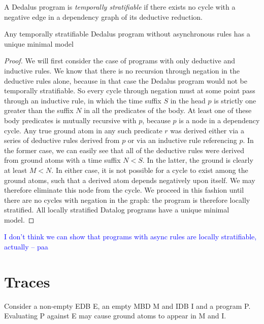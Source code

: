\documentclass{acm_proc_article-sp-sigmod09}
\newcommand{\paa}[1]{{\textcolor{blue}{#1 -- paa}}}
\begin{document}
\begin{definition}
A Dedalus program is \emph{temporally stratifiable} if there exists no cycle with a negative edge in a dependency graph of
its deductive reduction.
\end{definition}

\begin{lemma}
Any temporally stratifiable Dedalus program without asynchronous rules has a unique minimal model
\end{lemma}
\begin{proof}
We will first consider the case of programs with only deductive and inductive rules.  We know that there is no recursion
through negation in the deductive rules alone, because in that case the Dedalus program would not be temporally 
stratifiable.  So every cycle through negation must at some point pass through an inductive rule, in which the time suffix $S$ in
the head $p$ is strictly one greater than the suffix $N$ in all the predicates of the body.  At least one of these body predicates is mutually recursive
with $p$, because $p$ is a node in a dependency cycle.  Any true ground atom in any such predicate $r$
was derived either via a series of deductive rules derived from $p$ or via an inductive rule referencing $p$.  In the former case, we can
easily see that all of the deductive rules were derived from ground atoms with a time suffix $N < S$.  In the latter, the ground is clearly at 
least $M < N$.  In either case, it is not possible for a cycle to exist among the ground atoms, such that a derived atom depends negatively upon itself.
We may therefore eliminate this node from the cycle.  We proceed in this fashion until there are no cycles with negation in the graph: the program is 
therefore locally stratified.  All locally stratified Datalog programs have a unique minimal model.


\end{proof}

\paa{I don't think we can show that programs with async rules are locally stratifiable, actually}



\section{Traces}

Consider a non-empty EDB E, an empty MBD M and IDB I and a program P.  Evaluating P against E may cause 
ground atoms to appear in M and I.
\end{document}
